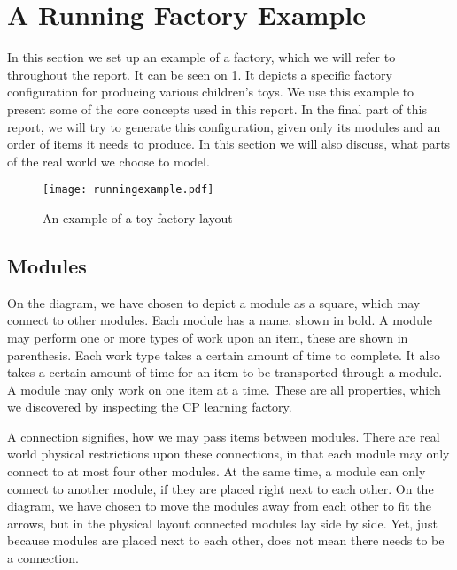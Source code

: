 \section{A Running Factory Example}\label{sec:runningexample}
In this section we set up an example of a factory, which we will refer to throughout the report. It can be seen on \cref{fig:running-example}. It depicts a specific factory configuration for producing various children's toys. We use this example to present some of the core concepts used in this report. In the final part of this report, we will try to generate this configuration, given only its modules and an order of items it needs to produce. In this section we will also discuss, what parts of the real world we choose to model.

\begin{figure}[h]
\centering
\texttt{[image: runningexample.pdf]}
\caption{An example of a toy factory layout}
\label{fig:running-example}
\end{figure}

\subsection{Modules}
On the diagram, we have chosen to depict a module as a square, which may connect to other modules. Each module has a name, shown in bold. A module may perform one or more types of work upon an item, these are shown in parenthesis. Each work type takes a certain amount of time to complete. It also takes a certain amount of time for an item to be transported through a module. A module may only work on one item at a time. These are all properties, which we discovered by inspecting the CP learning factory.

A connection signifies, how we may pass items between modules. There are real world physical restrictions upon these connections, in that each module may only connect to at most four other modules. At the same time, a module can only connect to another module, if they are placed right next to each other. On the diagram, we have chosen to move the modules away from each other to fit the arrows, but in the physical layout connected modules lay side by side. Yet, just because modules are placed next to each other, does not mean there needs to be a connection. 

